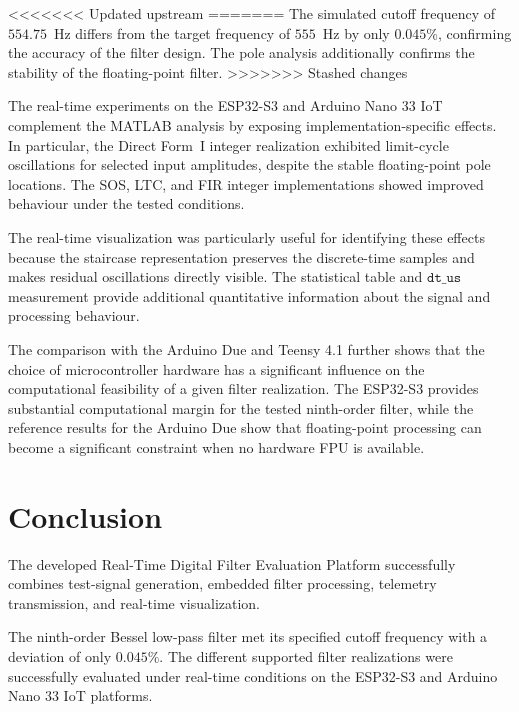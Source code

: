 <<<<<<< Updated upstream
=======
The simulated cutoff frequency of $554.75$~Hz differs from the target frequency
of $555$~Hz by only $0.045\%$, confirming the accuracy of the filter design.
The pole analysis additionally confirms the stability of the floating-point
filter.
>>>>>>> Stashed changes

The real-time experiments on the ESP32-S3 and Arduino Nano 33 IoT complement
the MATLAB analysis by exposing implementation-specific effects. In particular,
the Direct Form~I integer realization exhibited limit-cycle oscillations for
selected input amplitudes, despite the stable floating-point pole locations.
The SOS, LTC, and FIR integer implementations showed improved behaviour under
the tested conditions.

The real-time visualization was particularly useful for identifying these
effects because the staircase representation preserves the discrete-time
samples and makes residual oscillations directly visible. The statistical table
and $\texttt{dt\_us}$ measurement provide additional quantitative information
about the signal and processing behaviour.

The comparison with the Arduino Due and Teensy 4.1 further shows that the
choice of microcontroller hardware has a significant influence on the
computational feasibility of a given filter realization. The ESP32-S3 provides
substantial computational margin for the tested ninth-order filter, while the
reference results for the Arduino Due show that floating-point processing can
become a significant constraint when no hardware FPU is available.


\section{Conclusion}
\label{sec:conclusion}

The developed Real-Time Digital Filter Evaluation Platform successfully
combines test-signal generation, embedded filter processing, telemetry
transmission, and real-time visualization.

The ninth-order Bessel low-pass filter met its specified cutoff frequency with
a deviation of only $0.045\%$. The different supported filter realizations were
successfully evaluated under real-time conditions on the ESP32-S3 and Arduino
Nano 33 IoT platforms.

